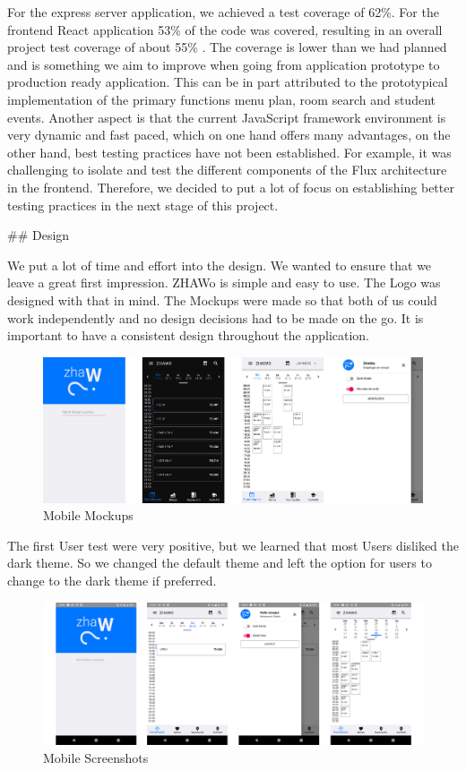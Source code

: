 \begin{markdown}
For the express server application, we achieved a test coverage of 62\%. For the frontend React application 53\% of the code was covered, resulting in an overall project test coverage of about 55\% \cite{OurCoverage}. The coverage is lower than we had planned and is something we aim to improve when going from application prototype to production ready application. This can be in part attributed to the prototypical implementation of the primary functions menu plan, room search and student events. Another aspect is that the current JavaScript framework environment is very dynamic and fast paced, which on one hand offers many advantages, on the other hand, best testing practices have not been established. For example, it was challenging to isolate and test the different components of the Flux architecture in the frontend. Therefore, we decided to put a lot of focus on establishing better testing practices in the next stage of this project.

\newpage

## Design

We put a lot of time and effort into the design. We wanted to ensure that we leave a great first impression.
ZHAWo is simple and easy to use. The Logo was designed with that in mind.
The Mockups were made so that both of us could work independently and no design decisions had to be made on the go. It is important to have a consistent design throughout the application.

\begin{figure}[H]
  \includegraphics[width=16cm, center]{../Mockups/Mobile_Mockups.png}
  \caption{\textsf{Mobile Mockups}}
\end{figure}

The first User test were very positive, but we learned that most Users disliked the dark theme. So we changed the default theme and left the option for users to change to the dark theme if preferred.

\begin{figure}[H]
  \includegraphics[width=16.5cm, center]{../Mockups/screenshots.png}
  \caption{\textsf{Mobile Screenshots}}
\end{figure}

\end{markdown}
